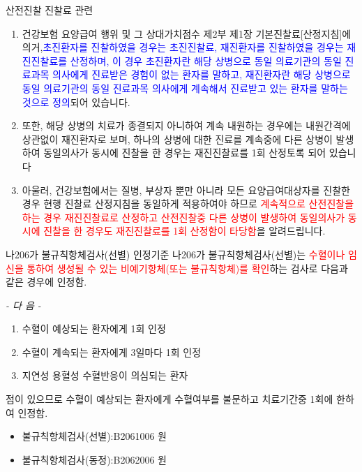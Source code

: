 \par
\medskip
\prezi{\clearpage}
\begin{commentbox}{산전진찰 진찰료 관련} 
\begin{enumerate}[1.]\tightlist
\item 건강보험 요양급여 행위 및 그 상대가치점수 제2부 제1장 기본진찰료[산정지침]에 의거,\textcolor{blue}{초진환자를 진찰하였을 경우는 초진진찰료, 재진환자를 진찰하였을 경우는 재진진찰료를 산정하며, 이 경우 초진환자란 해당 상병으로 동일 의료기관의 동일 진료과목 의사에게 진료받은 경험이 없는 환자를 말하고, 재진환자란 해당 상병으로 동일 의료기관의 동일 진료과목 의사에게 계속해서 진료받고 있는 환자를 말하는 것으로 정의}되어 있습니다.
\item 또한, 해당 상병의 치료가 종결되지 아니하여 계속 내원하는 경우에는 내원간격에 상관없이 재진환자로 보며, 하나의 상병에 대한 진료를 계속중에 다른 상병이 발생하여 동일의사가 동시에 진찰을 한 경우는 재진진찰료를 1회 산정토록 되어 있습니다
\item 아울러, 건강보험에서는 질병, 부상자 뿐만 아니라 모든 요양급여대상자를 진찰한 경우 현행 진찰료 산정지침을 동일하게 적용하여야 하므로 \textcolor{red}{계속적으로 산전진찰을 하는 경우 재진진찰료로 산정하고 산전진찰중 다른 상병이 발생하여 동일의사가 동시에 진찰을 한 경우도 재진진찰료를 1회 산정함이 타당함}을 알려드립니다. 
\end{enumerate}
\end{commentbox}  

\par
\medskip
\prezi{\clearpage}
\prezi{\clearpage}
\begin{commentbox}{나206가 불규칙항체검사(선별) 인정기준}
나206가 불규칙항체검사(선별)는 \textcolor{red}{수혈이나 임신을 통하여 생성될 수 있는 비예기항체(또는 불규칙항체)를 확인}하는 검사로 다음과 같은 경우에 인정함.
\begin{center}\emph{- 다 음 -}\end{center}
\begin{enumerate}[가.]\tightlist
\item 수혈이 예상되는 환자에게 1회 인정
\item 수혈이 계속되는 환자에게 3일마다 1회 인정
\item 지연성 용혈성 수혈반응이 의심되는 환자
\end{enumerate}
점이 있으므로 수혈이 예상되는 환자에게 수혈여부를 불문하고 치료기간중 1회에 한하여 인정함. 

\begin{itemize}\tightlist  
\item 불규칙항체검사(선별):B2061006  원
\item 불규칙항체검사(동정):B2062006  원
\end{itemize}

\end{commentbox}

